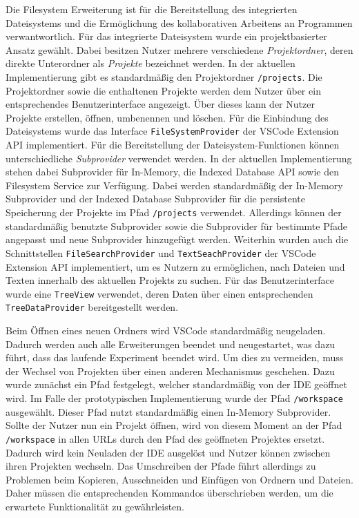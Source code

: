 Die Filesystem Erweiterung ist für die Bereitstellung des integrierten Dateisystems und die Ermöglichung des kollaborativen Arbeitens an Programmen verwantwortlich. Für das integrierte Dateisystem wurde ein projektbasierter Ansatz gewählt. Dabei besitzen Nutzer mehrere verschiedene \textit{Projektordner}, deren direkte Unterordner als \textit{Projekte} bezeichnet werden. In der aktuellen Implementierung gibt es standardmäßig den Projektordner \texttt{/projects}. Die Projektordner sowie die enthaltenen Projekte werden dem Nutzer über ein entsprechendes Benutzerinterface angezeigt. Über dieses kann der Nutzer Projekte erstellen, öffnen, umbenennen und löschen. Für die Einbindung des Dateisystems wurde das Interface \texttt{FileSystemProvider} der VSCode Extension API implementiert. Für die Bereitstellung der Dateisystem-Funktionen können unterschiedliche \textit{Subprovider} verwendet werden. In der aktuellen Implementierung stehen dabei Subprovider für In-Memory, die Indexed Database API sowie den Filesystem Service zur Verfügung. Dabei werden standardmäßig der In-Memory Subprovider und der Indexed Database Subprovider für die persistente Speicherung der Projekte im Pfad \texttt{/projects} verwendet. Allerdings können der standardmäßig benutzte Subprovider sowie die Subprovider für bestimmte Pfade angepasst und neue Subprovider hinzugefügt werden. Weiterhin wurden auch die Schnittstellen \texttt{FileSearchProvider} und \texttt{TextSeachProvider} der VSCode Extension API implementiert, um es Nutzern zu ermöglichen, nach Dateien und Texten innerhalb des aktuellen Projekts zu suchen. Für das Benutzerinterface wurde eine \texttt{TreeView} verwendet, deren Daten über einen entsprechenden \texttt{TreeDataProvider} bereitgestellt werden.

Beim Öffnen eines neuen Ordners wird VSCode standardmäßig neugeladen. Dadurch werden auch alle Erweiterungen beendet und neugestartet, was dazu führt, dass das laufende Experiment beendet wird. Um dies zu vermeiden, muss der Wechsel von Projekten über einen anderen Mechanismus geschehen. Dazu wurde zunächst ein Pfad festgelegt, welcher standardmäßig von der IDE geöffnet wird. Im Falle der prototypischen Implementierung wurde der Pfad \texttt{/workspace} ausgewählt. Dieser Pfad nutzt standardmäßig einen In-Memory Subprovider. Sollte der Nutzer nun ein Projekt öffnen, wird von diesem Moment an der Pfad \texttt{/workspace} in allen URLs durch den Pfad des geöffneten Projektes ersetzt. Dadurch wird kein Neuladen der IDE ausgelöst und Nutzer können zwischen ihren Projekten wechseln. Das Umschreiben der Pfade führt allerdings zu Problemen beim Kopieren, Ausschneiden und Einfügen von Ordnern und Dateien. Daher müssen die entsprechenden Kommandos überschrieben werden, um die erwartete Funktionalität zu gewährleisten.

